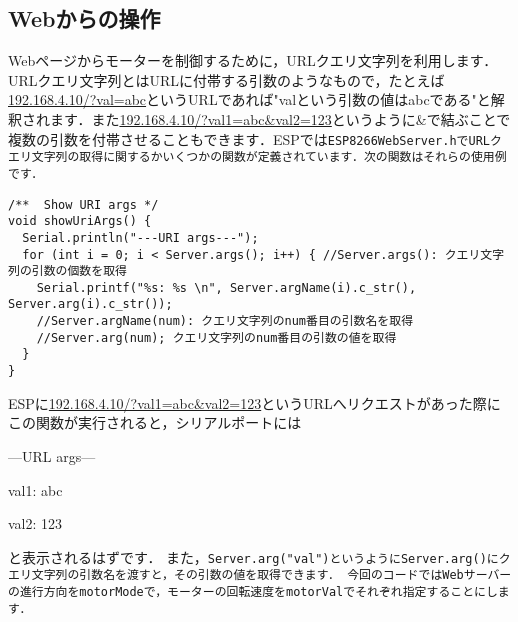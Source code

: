 \subsection{Webからの操作}
Webページからモーターを制御するために，URLクエリ文字列を利用します．URLクエリ文字列とはURLに付帯する引数のようなもので，たとえば\url{192.168.4.10/?val=abc}というURLであれば"valという引数の値はabcである"と解釈されます．また\url{192.168.4.10/?val1=abc&val2=123}というように\&で結ぶことで複数の引数を付帯させることもできます．ESPでは\tt{ESP8266WebServer.h}\rm{}でURLクエリ文字列の取得に関するかいくつかの関数が定義されています．次の関数はそれらの使用例です．
\begin{verbatim}
/**  Show URI args */
void showUriArgs() {
  Serial.println("---URI args---");
  for (int i = 0; i < Server.args(); i++) { //Server.args(): クエリ文字列の引数の個数を取得
    Serial.printf("%s: %s \n", Server.argName(i).c_str(), Server.arg(i).c_str()); 
    //Server.argName(num): クエリ文字列のnum番目の引数名を取得
    //Server.arg(num); クエリ文字列のnum番目の引数の値を取得
  }
}
\end{verbatim}
ESPに\url{192.168.4.10/?val1=abc&val2=123}というURLへリクエストがあった際にこの関数が実行されると，シリアルポートには
\tt{

---URL args---

val1: abc

val2: 123

}\rm{}
と表示されるはずです．
また，\tt{Server.arg("val")}\rm{}というように\tt{Server.arg()}\rm{}にクエリ文字列の引数名を渡すと，その引数の値を取得できます．
今回のコードではWebサーバーの進行方向をmotorModeで，モーターの回転速度をmotorValでそれぞれ指定することにします．



